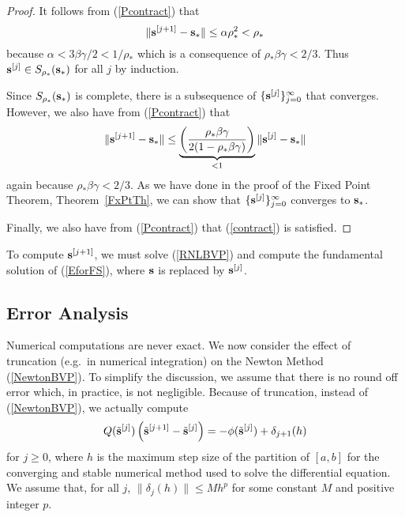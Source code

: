 \begin{proof}
It follows from (\ref{Pcontract}) that
\[
\| \mathbf{s}^{[j+1]} - \mathbf{s}_\ast \|
\leq \alpha \rho_\ast^2 < \rho_\ast
\]
because $\alpha < 3\beta\gamma/2 < 1/\rho_\ast$
which is a consequence of $\rho_\ast \beta \gamma < 2/3$.
Thus $\mathbf{s}^{[j]} \in S_{\rho_\ast}(\mathbf{s}_\ast)$ for all $j$ by
induction.

Since $S_{\rho_\ast}(\mathbf{s}_\ast)$ is complete, there is a subsequence of
$\{\mathbf{s}^{[j]}\}_{j=0}^\infty$ that converges.  However, we also
have from (\ref{Pcontract}) that
\begin{equation} \label{CforNewtonFP}
\| \mathbf{s}^{[j+1]} - \mathbf{s}_\ast \|
\leq
\underbrace{\left(\frac{\rho_\ast \beta \gamma}{2(1-\rho_\ast \beta\gamma)}
\right)}_{<1} \| \mathbf{s}^{[j]} - \mathbf{s}_\ast \|
\end{equation}
again because $\rho_\ast \beta \gamma < 2/3$.  As we have done in the
proof of the Fixed Point Theorem, Theorem~\ref{FxPtTh}, we can show
that $\{\mathbf{s}^{[j]}\}_{j=0}^\infty$ converges to $\mathbf{s}_\ast$.

Finally, we also have from (\ref{Pcontract}) that
(\ref{contract}) is satisfied.
\end{proof}

\begin{rmk}
To compute $\mathbf{s}^{[j+1]}$, we must solve (\ref{RNLBVP}) and compute the
fundamental solution of (\ref{EforFS}), where $\mathbf{s}$ is replaced by
$\mathbf{s}^{[j]}$.
\end{rmk}

\subsection{Error Analysis}

Numerical computations are never exact.  We now consider the
effect of truncation (e.g.\ in numerical integration) on the Newton
Method (\ref{NewtonBVP}).  To simplify the discussion, we assume that
there is no round off error which, in practice, is not negligible.
Because of truncation, instead of (\ref{NewtonBVP}), we actually
compute
\begin{equation} \label{NBVPtrunc}
Q(\tilde{\mathbf{s}}^{[j]}) \left( \tilde{\mathbf{s}}^{[j+1]}
- \tilde{\mathbf{s}}^{[j]}\right) =
- \phi(\tilde{\mathbf{s}}^{[j]}) + \delta_{j+1}(h)
\end{equation}
for  $j \geq 0$, where $h$ is the maximum step size of the partition
of $[a,b]$ for the converging and stable numerical method used to
solve the differential equation.  We assume that, for all $j$,
$\| \delta_j(h) \| \leq M h^p$ for some constant $M$ and positive
integer $p$.

